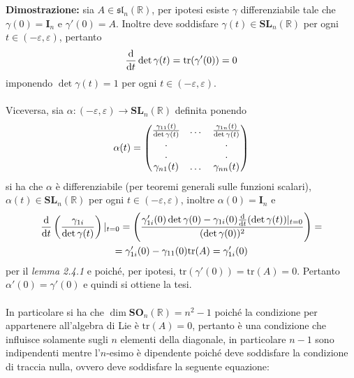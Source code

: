 \documentclass{article}
\begin{document}
\textbf{Dimostrazione:} sia $A \in \mathfrak{sl}_n(\mathbb{R})$, per ipotesi esiste $\gamma$ differenziabile tale che $\gamma(0) = \mathbf{I}_n$ e $\gamma'(0) = A$. Inoltre deve soddisfare $\gamma(t) \in \mathbf{SL}_n(\mathbb{R})$ per ogni $t \in (-\varepsilon, \varepsilon)$, pertanto
\begin{gather}
    \frac{\mathrm{d}}{\mathrm{d}t} \det \gamma(t) = \mathrm{tr} (\gamma'(0)) = 0 \notag
\end{gather}
imponendo $\det \gamma(t) = 1$ per ogni $t \in (-\varepsilon, \varepsilon)$. \\ \\
Viceversa, sia $\alpha : (-\varepsilon, \varepsilon) \longrightarrow \mathbf{SL}_n(\mathbb{R})$ definita ponendo
\begin{gather}
    \alpha(t) = \begin{pmatrix}
        \frac{\gamma_{11}(t)}{\det \gamma(t)} & \dots & \frac{\gamma_{1n}(t)}{\det \gamma(t)} \\
        . & & . \\
        . & & . \\
        \gamma_{n1}(t) & \dots & \gamma_{nn}(t)
    \end{pmatrix} \notag
\end{gather}
si ha che $\alpha$ è differenziabile (per teoremi generali sulle funzioni scalari), \\$\alpha(t) \in \mathbf{SL}_n(\mathbb{R})$ per ogni $t \in (-\varepsilon, \varepsilon)$, inoltre $\alpha(0) = \mathbf{I}_n$ e
\begin{gather}
    \frac{\mathrm{d}}{\mathrm{d}t} \left( \frac{\gamma_{1i}}{\det \gamma(t)} \right)|_{t = 0} = \left( \frac{\gamma'_{1i}(0) \det \gamma(0) - \gamma_{1i}(0) \frac{\mathrm{d}}{\mathrm{d}t} (\det \gamma(t))|_{t = 0}}{(\det \gamma(0))^2} \right) = \notag \\
    =  \gamma'_{1i}(0) - \gamma_{11}(0)\mathrm{tr}(A) = \gamma'_{1i}(0) \notag
\end{gather}
per il \textit{lemma 2.4.1} e poiché, per ipotesi, $\mathrm{tr}(\gamma'(0)) = \mathrm{tr}(A) = 0$. Pertanto $\alpha'(0) = \gamma'(0)$ e quindi si ottiene la tesi. \\ \\
In particolare si ha che $\dim \mathbf{SO}_n(\mathbb{R}) = n^2 - 1$ poiché la condizione per appartenere all'algebra di Lie è $\mathrm{tr}(A) = 0$, pertanto è una condizione che influisce solamente sugli $n$ elementi della diagonale, in particolare $n - 1$ sono indipendenti mentre l'$n$-esimo è dipendente poiché deve soddisfare la condizione di traccia nulla, ovvero deve soddisfare la seguente equazione:
\end{document}
